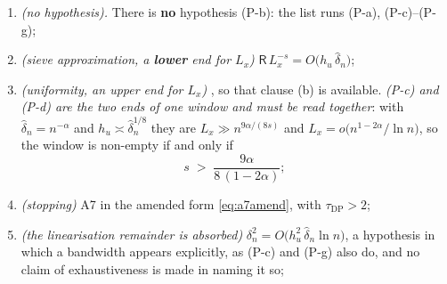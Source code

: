 \begin{proposition}
\begin{enumerate}
\item[(P-b)] \emph{(no hypothesis).} There is \textbf{no} hypothesis (P-b): the list runs
\textup{(P-a)}, \textup{(P-c)}--\textup{(P-g)};
\item[(P-c)] \emph{(sieve approximation, a \textbf{lower} end for $L_x$)}
$\mathsf R\,L_x^{-s}=O\big(h_u\,\hat\delta_n\big)$;
\item[(P-d)] \emph{(uniformity, an \emph{upper} end for $L_x$)} , so that
 clause (b) is available. \emph{(P-c) and (P-d) are the two ends of one window
and must be read together}: with $\hat\delta_n=n^{-\alpha}$ and $h_u\asymp\hat\delta_n^{1/8}$ they are
$L_x\gg n^{9\alpha/(8s)}$ and $L_x=o\big(n^{1-2\alpha}/\ln n\big)$, so the window is non-empty if and
only if
\begin{equation}\label{eq:lxwindow}
s\;>\;\frac{9\alpha}{8\,(1-2\alpha)} ;
\end{equation}
\item[(P-e)] \emph{(stopping)} A7 in the amended form \eqref{eq:a7amend}, with
$\tau_{\mathrm{DP}}>2$;
\item[(P-f)] \emph{(the linearisation remainder is absorbed)}
$\delta_n^{2}=O\big(h_u^{2}\,\hat\delta_n\ln n\big)$, a hypothesis in which a bandwidth appears
explicitly, as (P-c) and (P-g) also do, and no claim of exhaustiveness is made in naming it so;

\end{enumerate}
\end{proposition}
